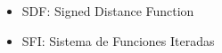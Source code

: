 \begin{itemize}
\item SDF: Signed Distance Function
\item SFI: Sistema de Funciones Iteradas
\end{itemize}